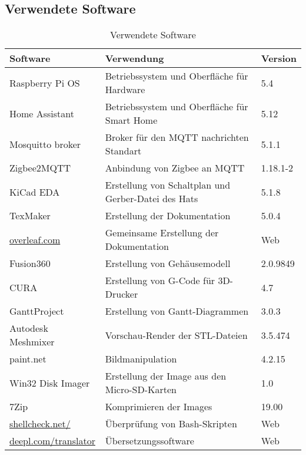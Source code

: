 \subsection{Verwendete Software}\label{qu_software}
\begin{table}[H]
\begin{tabularx}{\textwidth}{|p{5cm}|p{6cm}|p{3.2cm}|}
 	\hline 
 	\textbf{Software} & \textbf{Verwendung} & \textbf{Version} \\ 
 	\hline 
 	Raspberry Pi OS & Betriebssystem und Oberfläche für Hardware & 5.4 \\ 
 	\hline 
 	Home Assistant & Betriebssystem und Oberfläche für Smart Home & 5.12 \\ 
 	\hline
 	Mosquitto broker & Broker für den MQTT nachrichten Standart & 5.1.1 \\ 
 	\hline
 	Zigbee2MQTT & Anbindung von Zigbee an MQTT & 1.18.1-2 \\ 
 	\hline
 	KiCad EDA & Erstellung von Schaltplan und Gerber-Datei des Hats & 5.1.8 \\ 
 	\hline 
 	TexMaker & Erstellung der Dokumentation & 5.0.4 \\ 
 	\hline
 	\url{overleaf.com } & Gemeinsame Erstellung der Dokumentation & Web \\
 	\hline
 	Fusion360 & Erstellung von Gehäusemodell & 2.0.9849 \\ 
 	\hline
 	CURA & Erstellung von G-Code für 3D-Drucker & 4.7 \\ 
 	\hline
 	GanttProject & Erstellung von Gantt-Diagrammen & 3.0.3 \\ 
 	\hline
 	Autodesk Meshmixer & Vorschau-Render der STL-Dateien & 3.5.474 \\
 	\hline
 	paint.net & Bildmanipulation & 4.2.15\\
 	\hline
 	Win32 Disk Imager & Erstellung der Image aus den Micro-SD-Karten & 1.0 \\
 	\hline
 	7Zip & Komprimieren der Images & 19.00\\
 	\hline
 	\url{shellcheck.net/} & Überprüfung von Bash-Skripten & Web \\
 	\hline
 	\url{deepl.com/translator} & Übersetzungssoftware & Web \\
 	\hline
\end{tabularx} 
\caption{Verwendete Software}
\label{tab:qu_software}
\end{table}